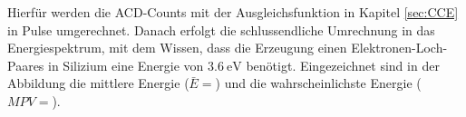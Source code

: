 Hierfür werden die ACD-Counts mit der Ausgleichsfunktion in Kapitel \ref{sec:CCE} in Pulse umgerechnet. Danach erfolgt die schlussendliche Umrechnung in das Energiespektrum, mit dem Wissen, dass die Erzeugung einen Elektronen-Loch-Paares in Silizium eine Energie von $\SI{3.6}{\eV}$ benötigt. Eingezeichnet sind in der Abbildung die mittlere Energie ($\bar{E}=$) und die wahrscheinlichste Energie ($MPV=$).
%
%
%     
%
%
